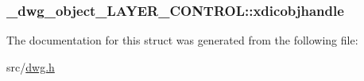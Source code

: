 \hypertarget{struct__dwg__object__LAYER__CONTROL_ae6a8fbce45e2e38dd21ec51223fcbbe3}{
\subsubsection[{xdicobjhandle}]{ {\bf \-\_\-dwg\-\_\-object\-\_\-\-L\-A\-Y\-E\-R\-\_\-\-C\-O\-N\-T\-R\-O\-L\-::xdicobjhandle}}}\label{struct__dwg__object__LAYER__CONTROL_ae6a8fbce45e2e38dd21ec51223fcbbe3}


\-The documentation for this struct was generated from the following file\-:\begin{DoxyCompactItemize}
\item 
src/\hyperlink{dwg_8h}{dwg.\-h}\end{DoxyCompactItemize}
